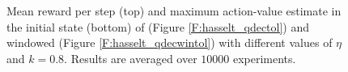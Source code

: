 \documentclass[conference]{IEEEtran}
\begin{document}
\begin{figure}[t]
\begin{minipage}{\columnwidth}
\end{minipage}
  \caption{Mean reward per step (top) and maximum action-value estimate in the initial state (bottom) of \alg (Figure \ref{F:hasselt_qdectol}) and windowed \alg (Figure \ref{F:hasselt_qdecwintol}) with different values of $\eta$ and $k = 0.8$. Results are averaged over $10000$ experiments.}
  \label{F:hasselt_QDecTol}
\end{figure}
\end{document}
